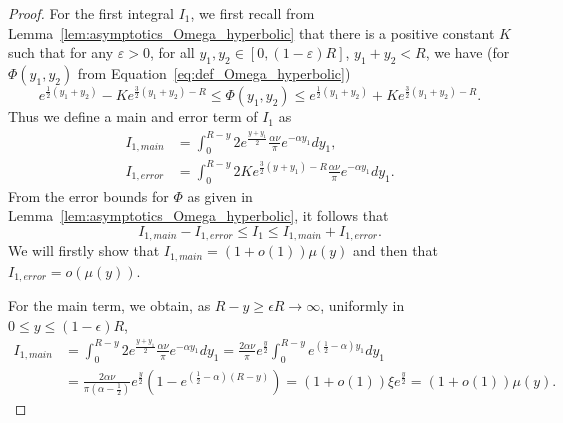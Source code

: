 \begin{proof}
For the first integral $I_1$, we first recall from Lemma~\ref{lem:asymptotics_Omega_hyperbolic} that there is a positive constant $K$ such that for any $\varepsilon >0$, for all $y_1, y_2 \in [0,(1-\varepsilon)R]$, $y_1+y_2 <R$, we have (for $\Phi(y_1,y_2)$ from Equation~\ref{eq:def_Omega_hyperbolic})
\[
	e^{\frac{1}{2}(y_1+y_2)} - Ke^{\frac{3}{2}(y_1+y_2)-R} \leq \Phi(y_1,y_2) \leq e^{\frac{1}{2}(y_1+y_2)} + Ke^{\frac{3}{2}(y_1+y_2)-R}.
\]
Thus we define a main and error term of $I_1$ as
\begin{align*}
I_{1,main} &=\int_0^{R-y} 2e^{\frac{y+y_1}{2}}\frac{\alpha\nu}{\pi}e^{-\alpha y_1}dy_1, \\
I_{1,error} &= \int_0^{R-y} 2Ke^{\frac{3}{2}(y+y_1)-R} \frac{\alpha\nu}{\pi} e^{-\alpha y_1} dy_1.
\end{align*}
From the error bounds for $\Phi$ as given in Lemma~\ref{lem:asymptotics_Omega_hyperbolic}, it follows that
$$I_{1,main}-I_{1,error} \leq I_1 \leq I_{1,main}+I_{1,error}. $$
We will firstly show that $I_{1,main} =(1+o(1))\mu(y) $ and then that $I_{1,error} = o(\mu(y))$.

For the main term, we obtain, as $R-y \geq \epsilon R \rightarrow \infty$, uniformly in $0\leq y\leq (1-\epsilon)R$,
\begin{align*}
I_{1,main} &= \int_0^{R-y} 2e^{\frac{y+y_1}{2}}\frac{\alpha\nu}{\pi}e^{-\alpha y_1}dy_1 
		= \frac{2\alpha\nu}{\pi}e^{\frac{y}{2}}\int_0^{R-y} e^{\left(\frac{1}{2}-\alpha\right)y_1}dy_1\\
	&=\frac{2\alpha\nu}{\pi\left(\alpha-\frac{1}{2}\right)}e^{\frac{y}{2}}
		\left(1-e^{\left(\frac{1}{2}-\alpha\right)(R-y)}\right)
		=(1+o(1))\xi e^{\frac{y}{2}} = (1+o(1))\mu(y).
\end{align*}


\end{proof}
